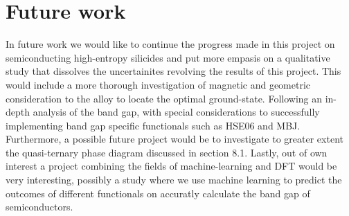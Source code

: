 \chapter{Future work}

In future work we would like to continue the progress made in this project on semiconducting high-entropy silicides and put more empasis on a qualitative study that dissolves the uncertainites revolving the results of this project. This would include a more thorough investigation of magnetic and geometric consideration to the  alloy to locate the optimal ground-state. Following an in-depth analysis of the band gap, with special considerations to successfully implementing band gap specific functionals such as HSE06 and MBJ. Furthermore, a possible future project would be to investigate to greater extent the quasi-ternary phase diagram discussed in section 8.1. Lastly, out of own interest a project combining the fields of machine-learning and DFT would be very interesting, possibly a study where we use machine learning to predict the outcomes of different functionals on accuratly calculate the band gap of semiconductors.   